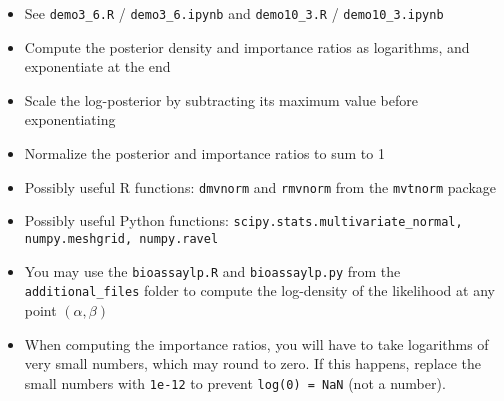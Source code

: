 \documentclass[a4paper,11pt]{article}
\begin{document}
\begin{itemize}
\item See {\tt demo3\_6.R} / {\tt demo3\_6.ipynb} and {\tt demo10\_3.R} / {\tt demo10\_3.ipynb}
\item Compute the posterior density and importance ratios as logarithms, and exponentiate at the end
\item Scale the log-posterior by subtracting its maximum value before
  exponentiating
  \item Normalize the posterior and importance ratios to sum to 1
  \item Possibly useful R functions: {\tt dmvnorm} and {\tt rmvnorm} from the {\tt mvtnorm} package
  \item Possibly useful Python functions: {\tt scipy.stats.multivariate\_normal, numpy.meshgrid, numpy.ravel}
  \item You may use the {\tt bioassaylp.R} and {\tt bioassaylp.py} from the {\tt additional\_files} folder to compute the log-density of the likelihood at any point $(\alpha, \beta)$
    \item When computing the importance ratios, you will have to take logarithms of very small numbers, which may round to zero. If this happens, replace the small numbers with {\tt 1e-12} to prevent {\tt log(0) = NaN} (not a number).
\end{itemize}
\end{document}
